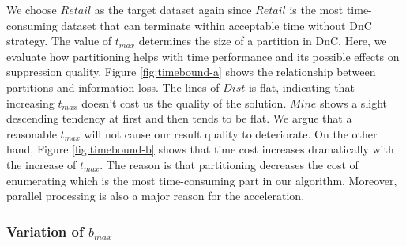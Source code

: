 We choose $Retail$ as the target dataset again since $Retail$
is the most time-consuming dataset that can terminate within
acceptable time without DnC strategy.
The value of $t_{max}$ determines the size of a partition in DnC.
Here, we evaluate how partitioning helps with time performance and
its possible effects on suppression quality.
Figure \ref{fig:timebound-a} shows the relationship between partitions
and information loss. The lines of  $Dist$ is flat, indicating that
increasing $t_{max}$ doesn't cost us the quality of the solution. $Mine$
shows a slight descending tendency at first and then tends to be flat.
We argue that a reasonable $t_{max}$ will not cause our result quality to
deteriorate.
On the other hand, Figure \ref{fig:timebound-b} shows that
time cost increases dramatically  with the increase of  $t_{max}$.
The reason is that partitioning decreases the cost of enumerating \qids which
is the most time-consuming part in our algorithm. Moreover, parallel
processing is also a major reason for the acceleration.

\subsubsection{Variation of $b_{max}$}

